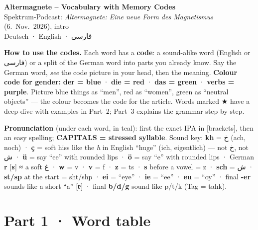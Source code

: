 \documentclass[10pt]{article}
\newcommand{\fa}[1]{{\farsifont\beginR #1\endR}}
\newcommand{\key}[1]{\textcolor{codec}{\textbf{#1}}}
\begin{document}
\begin{center}
{\LARGE\bfseries Altermagnete – Vocabulary with Memory Codes}\\[4pt]
{\large Spektrum-Podcast: \emph{Altermagnete: Eine neue Form des Magnetismus} (6.~Nov.~2026), intro}\\[2pt]
{\normalsize Deutsch · English · \fa{فارسی}}
\end{center}

\noindent\textbf{How to use the codes.} Each word has a \key{code}: a sound-alike word
(English or \fa{فارسی}) or a split of the German word into parts you already know. Say the
German word, \emph{see} the code picture in your head, then the meaning.
\textbf{Colour code for gender:}
\textcolor{derc}{\textbf{der = blue}} ·
\textcolor{diec}{\textbf{die = red}} ·
\textcolor{dasc}{\textbf{das = green}} ·
\textcolor{verbc}{\textbf{verbs = purple}}.
Picture blue things as “men”, red as “women”, green as “neutral objects” — the colour
becomes the code for the article. Words marked \textsf{★} have a deep-dive with examples in Part~2;
Part~3 explains the grammar step by step.

\medskip
\noindent\textbf{Pronunciation} (under each word, in \textcolor{pronc}{teal}): first the exact IPA in
\textsf{[brackets]}, then an easy spelling; \textbf{CAPITALS = stressed syllable}.
Sound key:
\textbf{kh} = \fa{خ} (ach, noch) ·
\textbf{ç} = soft hiss like the \emph{h} in English “huge” (ich, eigentlich) — not \fa{خ}, not \fa{ش} ·
\textbf{ü} = say “ee” with rounded lips ·
\textbf{ö} = say “e” with rounded lips ·
German \textbf{r} \textsf{[ʁ]} ≈ a soft \fa{غ} ·
\textbf{w} = v · \textbf{v} = f · \textbf{z} = ts · \textbf{s} before a vowel = z ·
\textbf{sch} = \fa{ش} · \textbf{st/sp} at the start = sht/shp ·
\textbf{ei} = “eye” · \textbf{ie} = “ee” · \textbf{eu} = “oy” ·
final \textbf{-er} sounds like a short “a” \textsf{[ɐ]} · final \textbf{b/d/g} sound like p/t/k (Tag = tahk).

\vspace{6pt}
\section*{Part 1 · Word table}
\end{document}

